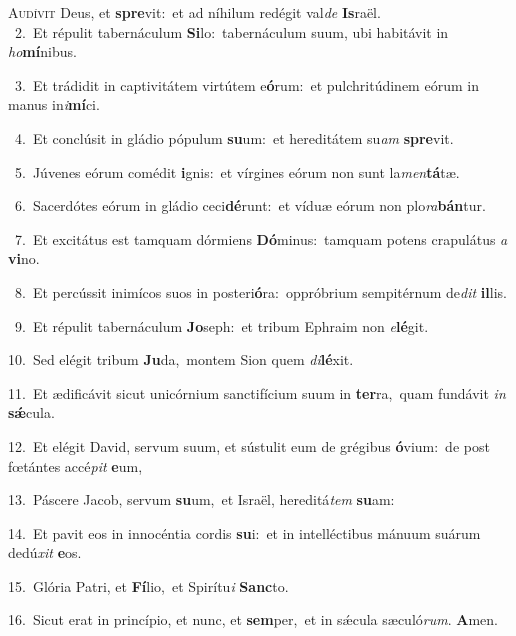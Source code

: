 \lettrine{\initial\textcolor{\initialcolor}{A}}{udívit} Deus, et \textbf{spre}\-vit:~\star et ad níhilum redégit val\textit{de} \textbf{Is}\-raël.\\
{\numbfont\textcolor{\numbcolor}{~2.}}~Et répulit tabernáculum \textbf{Si}\-lo:~\star tabernáculum suum, ubi habitávit in \textit{ho}\-\textbf{mí}nibus.\par
{\numbfont\textcolor{\numbcolor}{~3.}}~Et trádidit in captivitátem virtútem e\-\textbf{ó}\-rum:~\star et pulchritúdinem eórum in manus in\-\textit{i}\-\textbf{mí}ci.\par
{\numbfont\textcolor{\numbcolor}{~4.}}~Et conclúsit in gládio pópulum \textbf{su}\-um:~\star et hereditátem su\textit{am} \textbf{spre}\-vit.\par
{\numbfont\textcolor{\numbcolor}{~5.}}~Júvenes eórum comédit \textbf{i}\-gnis:~\star et vírgines eórum non sunt la\-\textit{men}\-\textbf{tá}tæ.\par
{\numbfont\textcolor{\numbcolor}{~6.}}~Sacerdótes eórum in gládio ceci\-\textbf{dé}\-runt:~\star et víduæ eórum non plo\-\textit{ra}\-\textbf{bán}tur.\par
{\numbfont\textcolor{\numbcolor}{~7.}}~Et excitátus est tamquam dórmiens \textbf{Dó}\-minus:~\star tamquam potens crapulátus \textit{a} \textbf{vi}\-no.\par
{\numbfont\textcolor{\numbcolor}{~8.}}~Et percússit inimícos suos in posteri\-\textbf{ó}\-ra:~\star oppróbrium sempitérnum de\textit{dit} \textbf{il}\-lis.\par
{\numbfont\textcolor{\numbcolor}{~9.}}~Et répulit tabernáculum \textbf{Jo}\-seph:~\star et tribum Ephraim non \textit{e}\-\textbf{lé}git.\par
{\numbfont\textcolor{\numbcolor}{10.}}~Sed elégit tribum \textbf{Ju}\-da,~\star montem Sion quem \textit{di}\-\textbf{lé}xit.\par
{\numbfont\textcolor{\numbcolor}{11.}}~Et ædificávit sicut unicórnium sanctifícium suum in \textbf{ter}\-ra,~\star quam fundávit \textit{in} \textbf{sǽ}\-cula.\par
{\numbfont\textcolor{\numbcolor}{12.}}~Et elégit David, servum suum, et sústulit eum de grégibus \textbf{ó}\-vium:~\star de post fœtántes accé\textit{pit} \textbf{e}\-um,\par
{\numbfont\textcolor{\numbcolor}{13.}}~Páscere Jacob, servum \textbf{su}\-um,~\star et Israël, hereditá\textit{tem} \textbf{su}\-am:\par
{\numbfont\textcolor{\numbcolor}{14.}}~Et pavit eos in innocéntia cordis \textbf{su}\-i:~\star et in intelléctibus mánuum suárum dedú\textit{xit} \textbf{e}\-os.\par
{\numbfont\textcolor{\numbcolor}{15.}}~Glória Patri, et \textbf{Fí}\-lio,~\star et Spirítu\textit{i} \textbf{Sanc}\-to.\par
{\numbfont\textcolor{\numbcolor}{16.}}~Sicut erat in princípio, et nunc, et \textbf{sem}\-per,~\star et in sǽcula sæculó\-\textit{rum}\-. \textbf{A}\-men.\par

